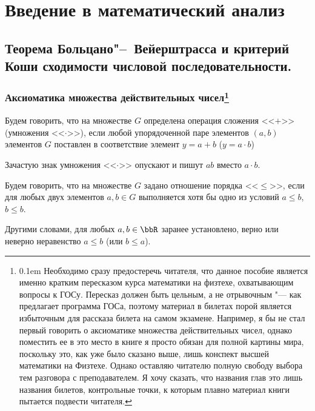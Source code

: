 \part{Введение в математический анализ}
\chapter{Теорема Больцано"--~Вейерштрасса и критерий Коши сходимости числовой последовательности.}

\section[Аксиоматика множества действительных чисел]{Аксиоматика множества действительных чисел\footnote{\leavevmode\vspace*{-\baselineskip}
%
\mbox{\kern0.1em}
Необходимо сразу предостеречь читателя, что данное пособие является именно кратким пересказом курса математики на физтехе, охватывающим вопросы к ГОСу. Пересказ должен быть цельным, а не отрывочным "--- как предлагает программа ГОСа, поэтому материал в билетах порой является избыточным для рассказа билета на самом экзамене. Например, я бы не стал первый говорить о аксиоматике множества действительных чисел, однако поместить ее в это место в книге я просто обязан для полной картины мира, поскольку это, как уже было сказано выше, лишь конспект высшей математики на Физтехе. Однако оставляю читателю полную свободу выбора тем разговора с преподавателем. Я хочу сказать, что названия глав это лишь названия билетов, контрольные точки, к которым плавно материал книги пытается подвести читателя.
}
}

\begin{defn}
Будем говорить, что на множестве $G$ определена операция сложения <<$+$>> (умножения <<$\cdot$>>), если любой упорядоченной паре элементов $(a,b)$ элементов $G$ поставлен в соответствие элемент $y = a + b$ ($y = a\cdot b$)
\end{defn}

Зачастую знак умножения <<$\cdot$>> опускают и пишут $ab$ вместо $a\cdot b$.

\begin{defn}
Будем говорить, что на множестве $G$ задано отношение порядка <<$\le$>>, если для любых двух элементов $a,b\in G$ выполняется хотя бы одно из условий $a\le b$, $b \le b$.
\end{defn}

Другими словами, для любых $a, b \in \bbR$ заранее установлено, верно или неверно неравенство $a \le b$ (или $b \le a$).

